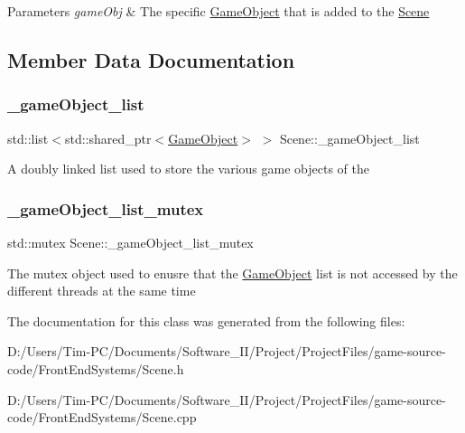 \begin{DoxyParams}{Parameters}
{\em game\+Obj} & The specific \hyperlink{class_game_object}{Game\+Object} that is added to the \hyperlink{class_scene}{Scene} \\
\hline
\end{DoxyParams}


\subsection{Member Data Documentation}
\mbox{\label{class_scene_a3ce74c2bdeb1bca46221645b309aa8cf}} 
\subsubsection{\texorpdfstring{\+\_\+game\+Object\+\_\+list}{\_gameObject\_list}}
{\footnotesize\ttfamily std\+::list$<$std\+::shared\+\_\+ptr$<$\hyperlink{class_game_object}{Game\+Object}$>$ $>$ Scene\+::\+\_\+game\+Object\+\_\+list\hspace{0.3cm}{\ttfamily [private]}}

A doubly linked list used to store the various game objects of the \mbox{\label{class_scene_a29183cf37f5227ea9a82d2a15c42336c}} 
\subsubsection{\texorpdfstring{\+\_\+game\+Object\+\_\+list\+\_\+mutex}{\_gameObject\_list\_mutex}}
{\footnotesize\ttfamily std\+::mutex Scene\+::\+\_\+game\+Object\+\_\+list\+\_\+mutex}

The mutex object used to enusre that the \hyperlink{class_game_object}{Game\+Object} list is not accessed by the different threads at the same time 

The documentation for this class was generated from the following files\+:\begin{DoxyCompactItemize}
\item 
D\+:/\+Users/\+Tim-\/\+P\+C/\+Documents/\+Software\+\_\+\+I\+I/\+Project/\+Project\+Files/game-\/source-\/code/\+Front\+End\+Systems/Scene.\+h\item 
D\+:/\+Users/\+Tim-\/\+P\+C/\+Documents/\+Software\+\_\+\+I\+I/\+Project/\+Project\+Files/game-\/source-\/code/\+Front\+End\+Systems/Scene.\+cpp\end{DoxyCompactItemize}
